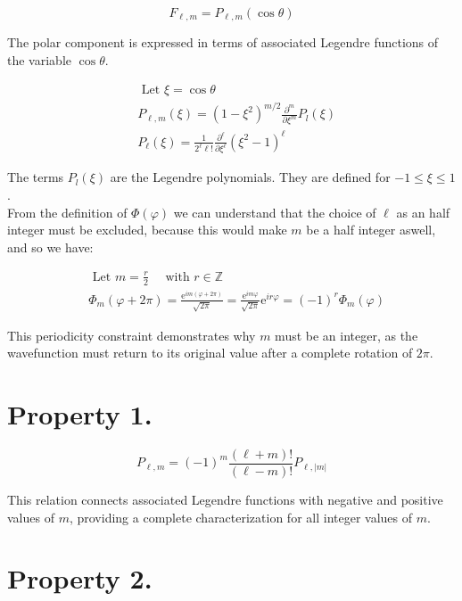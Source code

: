 \begin{equation}
F_{\ell, m}=P_{\ell, m}(\cos \theta)
\end{equation}

The polar component is expressed in terms of associated Legendre functions of the variable $\cos\theta$.

\begin{align}
& \text { Let } \xi=\cos \theta \\
& P_{\ell, m}(\xi)=\left(1-\xi^{2}\right)^{m / 2} \frac{\partial^{m}}{\partial \xi^{m}} P_{l}(\xi)  \\
& P_{\ell}(\xi)=\frac{1}{2^{\ell} \ell!} \frac{\partial^{\ell}}{\partial \xi^{\ell}}\left(\xi^{2}-1\right)^{\ell}
\end{align}

The terms $P_{l}(\xi)$ are the Legendre polynomials. They are defined for $-1 \leq \xi \leq 1$.\\
From the definition of $\Phi(\varphi)$ we can understand that the choice of $\ell$ as an half integer must be excluded, because this would make $m$ be a half integer aswell, and so we have:

\begin{align}
& \text { Let } m=\frac{r}{2} \quad \text { with } r \in \mathbb{Z} \\
& \Phi_{m}(\varphi+2 \pi)=\frac{\mathrm{e}^{i m(\varphi+2 \pi)}}{\sqrt{2 \pi}}=\frac{\mathrm{e}^{i m \varphi}}{\sqrt{2 \pi}} \mathrm{e}^{i r \varphi}=(-1)^{r} \Phi_{m}(\varphi)
\end{align}

This periodicity constraint demonstrates why $m$ must be an integer, as the wavefunction must return to its original value after a complete rotation of $2\pi$.

\section{Property 1.}

\begin{equation}
P_{\ell, m}=(-1)^{m} \frac{(\ell+m)!}{(\ell-m)!} P_{\ell,|m|}
\end{equation}

This relation connects associated Legendre functions with negative and positive values of $m$, providing a complete characterization for all integer values of $m$.

\section{Property 2.}

